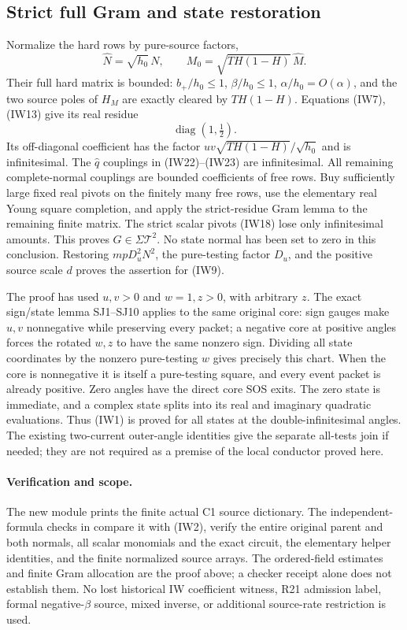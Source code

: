 \subsection{Strict full Gram and state restoration}

Normalize the hard rows by pure-source factors,
\[
 \widehat N=\sqrt{h_0}\,N,\qquad
 M_0=\sqrt{TH(1-H)}\,\widehat M.
\]
Their full hard matrix is bounded: $b_+/h_0\leq1$,
$\beta/h_0\leq1$, $\alpha/h_0=O(\alpha)$, and the two
source poles of $H_M$ are exactly cleared by $TH(1-H)$.
Equations (IW7), (IW13) give its real residue
\[
                           \operatorname{diag}(1,\tfrac12).
                                                               \tag{IW24}
\]
Its off-diagonal coefficient has the factor
$uv\sqrt{TH(1-H)}/\sqrt{h_0}$ and is infinitesimal.
The $\widehat q$ couplings in (IW22)--(IW23) are infinitesimal.
All remaining complete-normal couplings are bounded coefficients
of free rows. Buy sufficiently large fixed real pivots on the
finitely many free rows, use the elementary real Young square
completion, and apply the strict-residue Gram lemma to the
remaining finite matrix. The strict scalar pivots (IW18) lose only
infinitesimal amounts. This proves $G\in\Sigma\mathcal T^2$.
No state normal has been set to zero in this conclusion.
Restoring $mpD_u^2N^2$, the pure-testing factor $D_u$, and the
positive source scale $d$ proves the assertion for (IW9).

The proof has used $u,v>0$ and $w=1,z>0$, with arbitrary $z$.
The exact sign/state lemma SJ1--SJ10 applies to the same original
core: sign gauges make $u,v$ nonnegative while preserving every
packet; a negative core at positive angles forces the rotated
$w,z$ to have the same nonzero sign. Dividing all state coordinates
by the nonzero pure-testing $w$ gives precisely this chart.
When the core is nonnegative it is itself a pure-testing square,
and every event packet is already positive. Zero angles have the
direct core SOS exits. The zero state is immediate, and a complex
state splits into its real and imaginary quadratic evaluations.
Thus (IW1) is proved for all states at the double-infinitesimal
angles. The existing two-current outer-angle identities give the
separate all-tests join if needed; they are not required as a premise
of the local conductor proved here.

\paragraph{Verification and scope.}
The new module  prints the finite
actual C1 source dictionary. The independent-formula checks in
 compare it with (IW2),
verify the entire original parent and both normals, all scalar
monomials and the exact circuit, the elementary helper identities,
and the finite normalized source arrays. The ordered-field
estimates and finite Gram allocation are the proof above; a checker
receipt alone does not establish them. No lost historical IW
coefficient witness, R21 admission label, formal negative-$\beta$
source, mixed inverse, or additional source-rate restriction is used.
